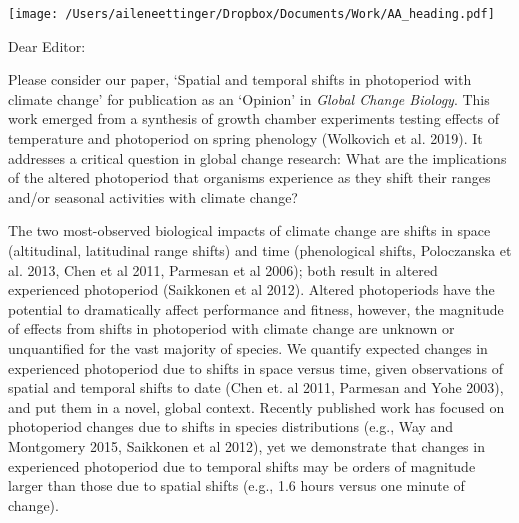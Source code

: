 \documentclass[10.7pt,a4paper]{letter}
\begin{document}

\begin{letter}{}
\texttt{[image: /Users/aileneettinger/Dropbox/Documents/Work/AA\_heading.pdf]}

\opening{Dear Editor:}
Please consider our paper, `Spatial and temporal shifts in photoperiod with climate change' for publication as an `Opinion' in \emph{Global Change Biology}. This work emerged from a synthesis of growth chamber experiments testing effects of temperature and photoperiod on spring phenology (Wolkovich et al. 2019). It addresses a critical question in global change research: What are the implications of the altered photoperiod that organisms experience as they shift their ranges and/or seasonal activities with climate change?

The two most-observed biological impacts of climate change are shifts in space (altitudinal, latitudinal range shifts) and time (phenological shifts, Poloczanska et al. 2013, Chen et al 2011, Parmesan et al 2006); both result in altered experienced photoperiod (Saikkonen et al 2012).  Altered photoperiods have the potential to dramatically affect performance and fitness, however, the magnitude of effects from shifts in photoperiod with climate change are unknown or unquantified for the vast majority of species.  We quantify expected changes in experienced photoperiod due to shifts in space versus time, given observations of spatial and temporal shifts to date (Chen et. al 2011, Parmesan and Yohe 2003), and put them in a novel, global context. Recently published work has focused on photoperiod changes due to shifts in species distributions (e.g., Way and Montgomery 2015, Saikkonen et al 2012), yet we demonstrate that changes in experienced photoperiod due to temporal shifts may be orders of magnitude larger than those due to spatial shifts (e.g., 1.6 hours versus one minute of change). %


\end{letter}
\end{document}
